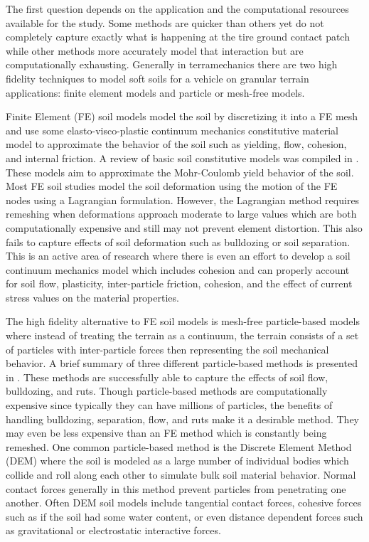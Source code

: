 \documentclass[12pt,onecolumn]{report}
\begin{document}
The first question depends on the application and the computational resources available for the study. Some methods are quicker than others yet do not completely capture exactly what is happening at the tire ground contact patch while other methods more accurately model that interaction but are computationally exhausting. Generally in terramechanics there are two high fidelity techniques to model soft soils for a vehicle on granular terrain applications: finite element models and particle or mesh-free models. 

Finite Element (FE) soil models model the soil by discretizing it into a FE mesh and use some elasto-visco-plastic continuum mechanics constitutive material model to approximate the behavior of the soil such as yielding, flow, cohesion, and internal friction. A review of basic soil constitutive models was compiled in \cite{SoilModels2009}. These models aim to approximate the Mohr-Coulomb yield behavior of the soil. Most FE soil studies model the soil deformation using the motion of the FE nodes using a Lagrangian formulation. However, the Lagrangian method requires remeshing when deformations approach moderate to large values which are both computationally expensive and still may not prevent element distortion. This also fails to capture effects of soil deformation such as bulldozing or soil separation. This is an active area of research where there is even an effort to develop a soil continuum mechanics model which includes cohesion and can properly account for soil flow, plasticity, inter-particle friction, cohesion, and the effect of current stress values on the material properties. 

The high fidelity alternative to FE soil models is mesh-free particle-based models where instead of treating the terrain as a continuum, the terrain consists of a set of particles with inter-particle forces then representing the soil mechanical behavior. A brief summary of three different particle-based methods is presented in \cite{SoilCharacteristics2017}. These methods are successfully able to capture the effects of soil flow, bulldozing, and ruts. Though particle-based methods are computationally expensive since typically they can have millions of particles, the benefits of handling bulldozing, separation, flow, and ruts make it a desirable method. They may even be less expensive than an FE method which is constantly being remeshed. One common particle-based method is the Discrete Element Method (DEM) where the soil is modeled as a large number of individual bodies which collide and roll along each other to simulate bulk soil material behavior. Normal contact forces generally in this method prevent particles from penetrating one another. Often DEM soil models include tangential contact forces, cohesive forces such as if the soil had some water content, or even distance dependent forces such as gravitational or electrostatic interactive forces. 
\end{document}
